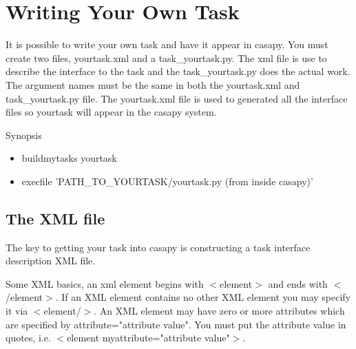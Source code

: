 \section{Writing Your Own Task}
It is possible to write your own task and have it appear in casapy. You must create two files,
 yourtask.xml and a task\_yourtask.py. The xml file is use to describe the interface to the task and 
the task\_yourtask.py does the actual work. The argument names must be the same in both the yourtask.xml
and task\_yourtask.py file. The yourtask.xml file is used to generated all the interface files so yourtask
will appear in the casapy system.

Synopsis 
\begin{itemize}
\item buildmytasks yourtask
\item execfile 'PATH\_TO\_YOURTASK/yourtask.py (from inside casapy)'
\end{itemize}

\subsection{The XML file}

The key to getting your task into casapy is constructing a task interface description XML file.  

Some XML basics, an xml element begins with $<$element$>$ and ends with $<$/element$>$. If an XML element
contains no other XML element you may specify it via $<$element/$>$. An XML element may have zero or
more attributes which are specified by attribute="attribute value". You must put the attribute value
in quotes, i.e. $<$element myattribute="attribute value"$>$. 

